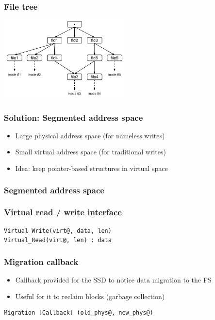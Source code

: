 \documentclass{beamer}
\begin{document}
\begin{frame}
  \frametitle{File tree}
  \begin{center}
  \includegraphics[width=250px]{file_tree.png}
  \end{center}
\end{frame}

\begin{frame}
  \frametitle{Solution: Segmented address space}
  \begin{itemize}
    \item Large physical address space (for nameless writes)
    \item Small virtual address space (for traditional writes)
    \item Idea: keep pointer-based structures in virtual space
  \end{itemize}
\end{frame}

\begin{frame}
  \frametitle{Segmented address space}
  \begin{center}
  \end{center}
\end{frame}

\begin{frame}[fragile]
  \frametitle{Virtual read / write interface}
  \begin{lstlisting}
Virtual_Write(virt@, data, len)
Virtual_Read(virt@, len) : data
  \end{lstlisting}
\end{frame}

\begin{frame}[fragile]
  \frametitle{Migration callback}
  \begin{itemize}
    \item Callback provided for the SSD to notice data migration to the FS
    \item Useful for it to reclaim blocks (garbage collection)
  \end{itemize}
  \begin{lstlisting}
Migration [Callback] (old_phys@, new_phys@)
  \end{lstlisting}
\end{frame}
\end{document}
